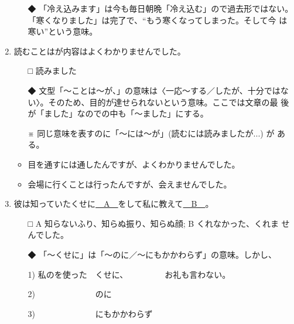 \documentclass[
uplatex,
b5paper,
10pt,
dvipdfmx
]{jsbook}
\begin{document}
\begin{enumerate}
\begin{itemize}
\item[◆] 「冷え込みます」は今も毎日朝晩「冷え込む」ので過去形ではない。
	  「寒くなりました」は完了で、``もう寒くなってしまった。そして今
	  は寒い''という意味。
\end{itemize}

\item 読むことは\underline{\hspace{3zw}}が内容はよくわかりませんでした。

\begin{itemize}
\item[□] 読みました
\item[◆]文型「〜ことは〜が、」の意味は〈一応〜する／したが、十分ではな
	 い〉。そのため、目的が達せられないという意味。ここでは文章の最
	 後が「ました」なので\underline{\hspace{3zw}}の中も「〜ました」にする。
\item[※] 同じ意味を表すのに「〜には〜が」(読むには読みましたが...)  が
	  ある。
\end{itemize}

\begin{itemize}
\item 目を通すには通したんですが、よくわかりませんでした。
\item 会場に行くことは行ったんですが、会えませんでした。
\end{itemize}

\item 彼は知っていたくせに\underline{　A　}をして私に教えて\underline{　B　}。

\begin{itemize}
 \item[□] A 知らないふり、知らぬ振り、知らぬ顔; B くれなかった、くれま
	   せんでした。
\item[◆]「〜くせに」は「〜のに／〜にもかかわらず」の意味。しかし、
\end{itemize}

\begin{itemize}
\item[1)] 私のを使った　くせに、　　　　　お礼も言わない。
\item[2)] 　　　　　　　のに
\item[3)] 　　　　　　　にもかかわらず
\end{itemize}


\end{enumerate}
\end{document}

